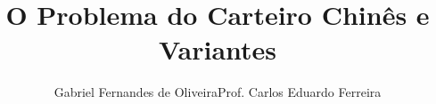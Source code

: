 \documentclass{beamer}
\title[Problema do Carteiro Chinês e Variantes]{O Problema do Carteiro Chinês e Variantes}
\author[Gabriel F. Oliveira]{Gabriel Fernandes de Oliveira\newline Prof. Carlos Eduardo Ferreira}
\institute[IME - USP]{Instituto de Matemática e Estatística}
\begin{document}

\begin{frame}
    \titlepage
\end{frame}
    

\end{document}
